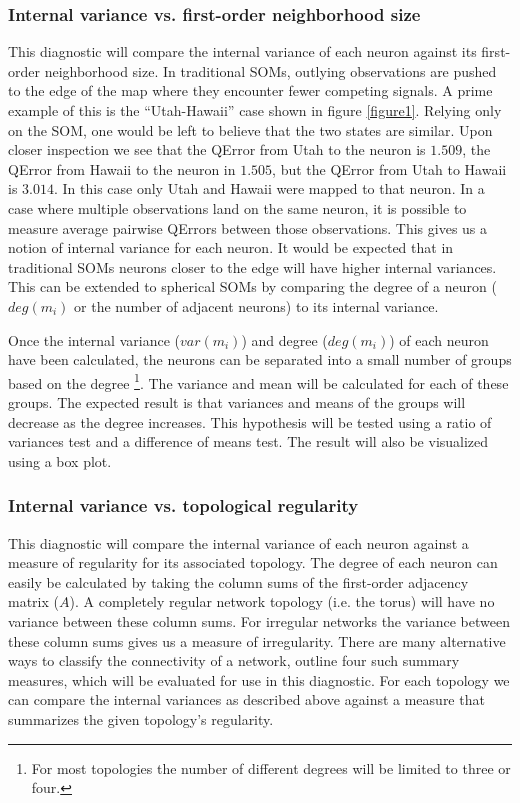 \documentclass[10pt,titlepage]{article}
\begin{document}
\subsubsection{Internal variance vs. first-order neighborhood size}
This diagnostic will compare the internal variance of each neuron against its
first-order neighborhood size.  In traditional SOMs, outlying observations are
pushed to the edge of the map where they encounter fewer competing signals. A
prime example of this is the ``Utah-Hawaii'' case shown in figure
\ref{figure1}.  Relying only on the SOM, one would be left to believe that the
two states are similar. Upon closer inspection we see that the QError from
Utah to the neuron is $1.509$, the QError from Hawaii to the neuron in
$1.505$, but the QError from Utah to Hawaii is $3.014$. In this case only Utah
and Hawaii were mapped to that neuron.  In a case where multiple observations
land on the same neuron, it is possible to measure average pairwise QErrors
between those observations.  This gives us a notion of internal variance for
each neuron. It would be expected that in traditional SOMs neurons closer to
the edge will have higher internal variances. This can be extended to
spherical SOMs by comparing the degree of a neuron ($deg(m_i)$ or the number of
adjacent neurons) to its internal variance.

Once the internal variance ($var(m_i)$) and degree ($deg(m_i)$) of each neuron
have been calculated, the neurons can be separated into a small number of
groups based on the degree \footnote{For most topologies the number of
different degrees will be limited to three or four.}.  The variance and mean
will be calculated for each of these groups.  The expected result is that
variances and means of the groups will decrease as the degree increases.  This
hypothesis will be tested using a ratio of variances test and a difference of
means test.  The result will also be visualized using a box plot.

\subsubsection{Internal variance vs. topological regularity}
This diagnostic will compare the internal variance of each neuron against a
measure of regularity for its associated topology.  The degree of each neuron
can easily be calculated by taking the column sums of the first-order
adjacency matrix ($A$).  A completely regular network topology (i.e. the
torus) will have no variance between these column sums.  For irregular
networks the variance between these column sums gives us a measure of
irregularity. There are many alternative ways to classify the connectivity of
a network, \cite{florax95} outline four such summary measures, which will be
evaluated for use in this diagnostic.  For each topology we can compare the
internal variances as described above against a measure that summarizes the
given topology's regularity.
\end{document}
